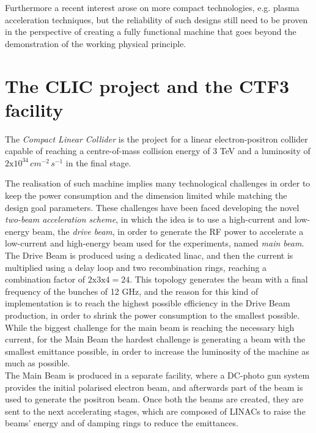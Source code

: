 Furthermore a recent interest arose on more compact technologies, e.g. plasma acceleration techniques, but the reliability of such designs still need to be proven in the perspective of creating a fully functional machine that goes beyond the demonstration of the working physical principle.



\section{The CLIC project and the CTF3 facility}

The \textit{Compact Linear Collider} is the project for a linear electron-positron collider capable of reaching a centre-of-mass collision energy of 3 TeV and a luminosity of $2\text{x}10^{34} \, cm^{-2} \, s^{-1}$ in the final stage.

The realisation of such machine implies many technological challenges in order to keep the power consumption and the dimension limited while matching the design goal parameters. These challenges have been faced developing the novel \textit{two-beam acceleration scheme}, in which the idea is to use a high-current and low-energy beam, the \textit{drive beam}, in order to generate the RF power to accelerate a low-current and high-energy beam used for the experiments, named \textit{main beam}. \\
The Drive Beam is produced using a dedicated linac, and then the current is multiplied using a delay loop and two recombination rings, reaching a combination factor of $2\text{x}3\text{x}4=24$. This topology generates the beam with a final frequency of the bunches of 12 GHz, and the reason for this kind of implementation is to reach the highest possible efficiency in the Drive Beam production, in order to shrink the power consumption to the smallest possible. While the biggest challenge for the main beam is reaching the necessary high current, for the Main Beam the hardest challenge is generating a beam with the smallest emittance possible, in order to increase the luminosity of the machine as much as possible.\\
The Main Beam is produced in a separate facility, where a DC-photo gun system provides the initial polarised electron beam, and afterwards part of the beam is used to generate the positron beam. Once both the beams are created, they are sent to the next accelerating stages, which are composed of LINACs to raise the beams' energy and of damping rings to reduce the emittances. 


